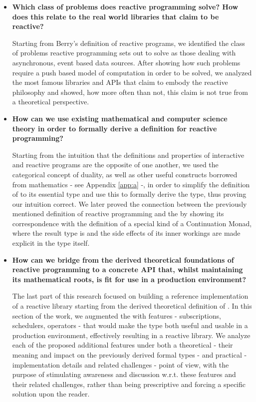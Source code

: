 \begin{itemize}
\item \textbf{Which class of problems does reactive programming solve? How does this relate to the real world libraries that claim to be reactive?}

Starting from Berry's definition of reactive programs\cite{berry1991reactive}, we identified the class of problems reactive programming sets out to solve as those dealing with asynchronous, event based data sources. After showing how such problems require a push based model of computation in order to be solved, we analyzed the most famous libraries and APIs that claim to embody the reactive philosophy and showed, how more often than not, this claim is not true from a theoretical perspective. 

\item \textbf{How can we use existing mathematical and computer science theory in order to formally derive a definition for reactive programming?}

Starting from the intuition that the definitions and properties of interactive and reactive programs are the opposite of one another, we used the categorical concept of duality, as well as other useful constructs borrowed from mathematics - see Appendix \ref{app:a} -, in order to simplify the definition of  to its essential type and use this to formally derive the  type, thus proving our intuition correct.
We later proved the connection between the previously mentioned definition of reactive programming and the  by showing its correspondence with the definition of a special kind of a Continuation Monad, where the result type is  and the side effects of its inner workings are made explicit in the type itself.

\item \textbf{How can we bridge from the derived theoretical foundations of reactive programming to a concrete API that, whilst maintaining its mathematical roots, is fit for use in a production environment?}

The last part of this research focused on building a reference implementation of a reactive library starting from the derived theoretical definition of . In this section of the work, we augmented the  with features - subscriptions, schedulers, operators - that would make the type both useful and usable in a production environment, effectively resulting in a reactive library. We analyze each of the proposed additional features under both a theoretical - their meaning and impact on the previously derived formal types - and practical - implementation details and related challenges - point of view, with the purpose of stimulating awareness and discussion w.r.t. these features and their related challenges, rather than being prescriptive and forcing a specific solution upon the reader.

\end{itemize}

